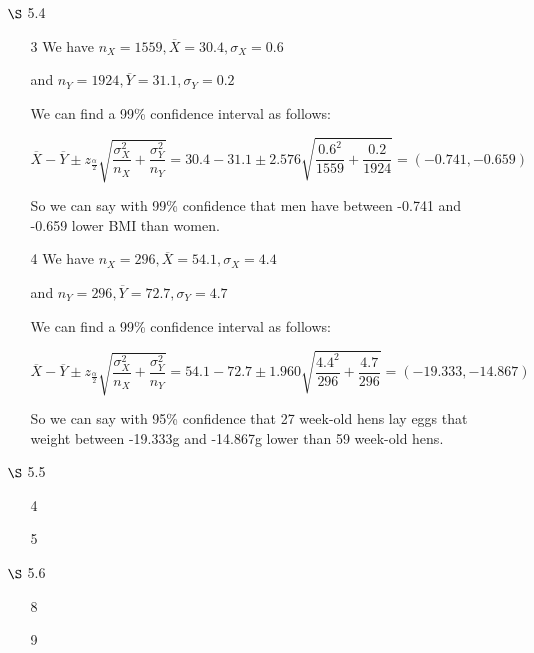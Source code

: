 \documentclass[12pt,letterpaper]{article}
\begin{document}
\begin{enumerate}
\begin{enumerate}
          We compute
          \[
            13 \pm 2.977 \frac{2}{\sqrt{15}} = (11.463, 14.537)
          \]

          So we can say with 99\% confidence
          that the mean track length is in the interval (11.463\si{\um}, 14.537\si{\um}).
        \item [11]
          We have $n = 6, \overline{X} = 2.03, s = 0.090$.

          We compute
          \[
            2.03 \pm 2.015 \frac{0.090}{\sqrt{6}} = (1.956, 2.104)
          \]

          So we can say with 90\% confidence
          that the mean deflection caused by a 160\si{\kN} load
          is in the interval (1.956\si{\mm}, 2.104\si{\mm}).
      \end{enumerate}
    \item [$\S$ 5.4]
      \begin{enumerate}
        \item [3]
          We have $n_X = 1559, \overline{X} = 30.4, \sigma_X = 0.6$

          and $n_Y = 1924, \overline{Y} = 31.1, \sigma_Y = 0.2$

          We can find a 99\% confidence interval as follows:

          \[
            \overline{X} - \overline{Y} \pm z_{\frac{\alpha}{2}} \sqrt{\frac{\sigma_X^2}{n_X} + \frac{\sigma_Y^2}{n_Y}} =
            30.4 - 31.1 \pm 2.576 \sqrt{\frac{0.6^2}{1559} + \frac{0.2}{1924}} =
            (-0.741, -0.659)
          \]

          So we can say with 99\% confidence that men have between -0.741 and -0.659 lower BMI than women.
        \item [4]
          We have $n_X = 296, \overline{X} = 54.1, \sigma_X = 4.4$

          and $n_Y = 296, \overline{Y} = 72.7, \sigma_Y = 4.7$

          We can find a 99\% confidence interval as follows:

          \[
            \overline{X} - \overline{Y} \pm z_{\frac{\alpha}{2}} \sqrt{\frac{\sigma_X^2}{n_X} + \frac{\sigma_Y^2}{n_Y}} =
            54.1 - 72.7 \pm 1.960 \sqrt{\frac{4.4^2}{296} + \frac{4.7}{296}} =
            (-19.333, -14.867)
          \]

          So we can say with 95\% confidence that 27 week-old hens lay eggs that weight between -19.333\si{\g} and -14.867\si{\g} lower than 59 week-old hens.
      \end{enumerate}
    \item [$\S$ 5.5]
      \begin{enumerate}
        \item [4]
        \item [5]
      \end{enumerate}
    \item [$\S$ 5.6]
      \begin{enumerate}
        \item [8]
        \item [9]
      \end{enumerate}
  \end{enumerate}
\end{document}
